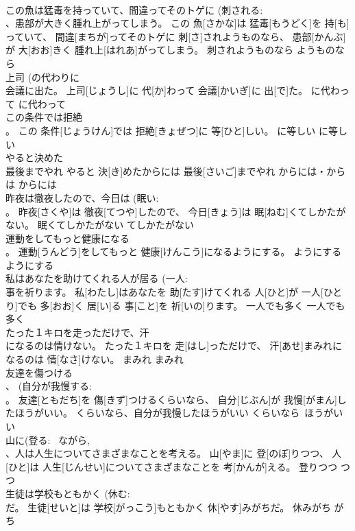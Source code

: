 \documentclass[8pt]{extreport}
\begin{document}
\begin{CJK}{UTF8}{min}
\\	この魚は猛毒を持っていて、間違ってそのトゲに (刺される: 
\\	、患部が大きく腫れ上がってしまう。	この 魚[さかな]は 猛毒[もうどく]を 持[も]っていて、 間違[まちが]ってそのトゲに 刺[さ]されようものなら、 患部[かんぶ]が 大[おお]きく 腫れ上[はれあ]がってしまう。	刺されようものなら	ようものなら	
\\	上司 (の代わりに 
\\	会議に出た。	上司[じょうし]に 代[か]わって 会議[かいぎ]に 出[で]た。	に代わって	に代わって	
\\	この条件では拒絶 
\\	。	この 条件[じょうけん]では 拒絶[きょぜつ]に 等[ひと]しい。	に等しい	に等しい	
\\	やると決めた 
\\	最後までやれ	やると 決[き]めたからには 最後[さいご]までやれ	からには・からは	からには	
\\	昨夜は徹夜したので、今日は (眠い: 
\\	。	昨夜[さくや]は 徹夜[てつや]したので、 今日[きょう]は 眠[ねむ]くてしかたがない。	眠くてしかたがない	てしかたがない	
\\	運動をしてもっと健康になる 
\\	。	運動[うんどう]をしてもっと 健康[けんこう]になるようにする。	ようにする	ようにする	
\\	私はあなたを助けてくれる人が居る (一人: 
\\	事を祈ります。	私[わたし]はあなたを 助[たす]けてくれる 人[ひと]が 一人[ひとり]でも 多[おお]く 居[い]る 事[こと]を 祈[いの]ります。	一人でも多く	一人でも多く	
\\	たった１キロを走っただけで、汗 
\\	になるのは情けない。	たった１キロを 走[はし]っただけで、 汗[あせ]まみれになるのは 情[なさ]けない。	まみれ	まみれ	
\\	友達を傷つける 
\\	、 (自分が我慢する: 
\\	。	友達[ともだち]を 傷[きず]つけるくらいなら、 自分[じぶん]が 我慢[がまん]したほうがいい。	くらいなら、自分が我慢したほうがいい	くらいなら~ほうがいい	
\\	山に(登る: ~ながら, 
\\	、人は人生についてさまざまなことを考える。	山[やま]に 登[のぼ]りつつ、 人[ひと]は 人生[じんせい]についてさまざまなことを 考[かんが]える。	登りつつ	つつ	
\\	生徒は学校もともかく (休む: 
\\	だ。	生徒[せいと]は 学校[がっこう]もともかく 休[やす]みがちだ。	休みがち	がち	

\end{CJK}
\end{document}
